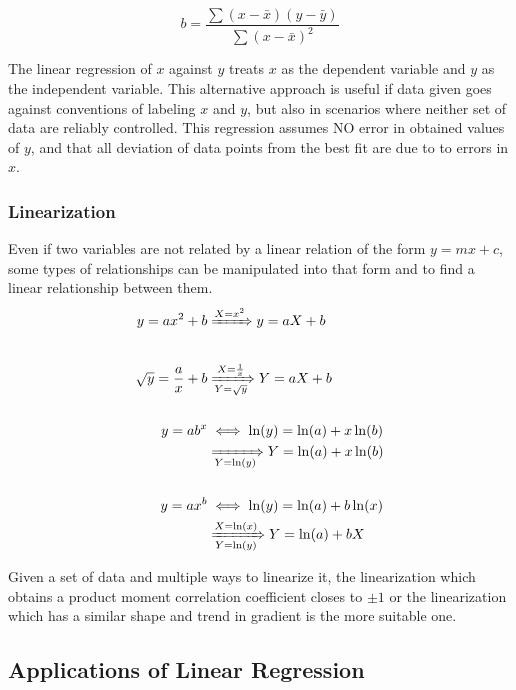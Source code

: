 \documentclass[../main]{subfiles}
\begin{document}
		\[ b = \frac{\sum (x-\bar{x})(y-\bar{y})}{\sum (x-\bar{x})^2}\]

	The linear regression of \(x\) against \(y\) treats \(x\) as the dependent variable and \(y\) as the independent variable. This alternative approach is useful if data given goes against conventions of labeling \(x\) and \(y\), but also in scenarios where neither set of data are reliably controlled. This regression assumes NO error in obtained values of \(y\), and that all deviation of data points from the best fit are due to to errors in \(x\).

	\subsubsection{Linearization}

	Even if two variables are not related by a linear relation of the form \(y=mx+c\), some types of relationships can be manipulated into that form and to find a linear relationship between them. \\

	\begin{equation*} \begin{aligned}
		y = a x^2 + b & \xRightarrow{X = x^2} y = aX + b \\ & \\
		\sqrt{y} = \frac{a}{x} + b & \xRightarrow[Y = \sqrt{y}]{X = \frac{1}{x}} Y = aX + b \\ & \\
		y = ab^x & \iff \ln(y) = \ln(a) + x \ln(b) \\ & \xRightarrow[Y = \ln(y)]{} Y = \ln(a) + x \ln(b) \\ & \\
		y = ax^b & \iff \ln(y) = \ln(a) + b \ln(x) \\ & \xRightarrow[Y = \ln(y)]{X = \ln(x)} Y = \ln(a) + bX \\
	\end{aligned} \end{equation*}

	Given a set of data and multiple ways to linearize it, the linearization which obtains a product moment correlation coefficient closes to \(\pm 1\) or the linearization which has a similar shape and trend in gradient is the more suitable one.

	\subsection{Applications of Linear Regression}
\end{document}

